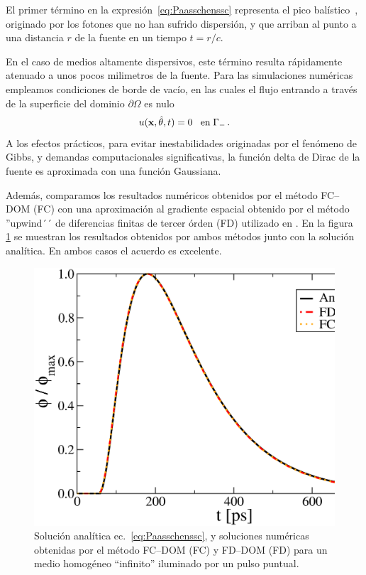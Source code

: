 El primer término en la expresión~\eqref{eq:Paasschenssc} 
representa el pico balístico~\cite{Paasschens1997}, originado 
por los fotones que no han sufrido dispersión, y que arriban al punto 
a una distancia $r$ de la fuente en un tiempo $t=r/c$.

En el caso de medios altamente dispersivos, este término resulta rápidamente atenuado 
a unos pocos milimetros de la fuente. Para las simulaciones numéricas 
empleamos condiciones de borde de vacío, en las cuales el flujo 
entrando a través de la superficie del dominio $\partial \Omega$ es nulo 
\begin{equation}
u(\mathbf{x},\hat{\theta},t)=0 \;\;\; \text{en}\; \Gamma_{-} \, .
\label{eq:vacuumbc}
\end{equation}
A los efectos prácticos, para evitar inestabilidades originadas 
por el fenómeno de Gibbs, y demandas computacionales significativas, 
la función delta de Dirac de la fuente es aproximada con una función Gaussiana.

Además, comparamos los resultados numéricos obtenidos por el método FC--DOM (FC)
con una aproximación al gradiente espacial obtenido por el método ''upwind´´ 
de diferencias finitas de tercer órden (FD) utilizado en \cite{Fujii2014}. 
En la figura~ \ref{fig:analytic1} se muestran los resultados obtenidos por ambos métodos 
junto con la solución analítica. En ambos casos el acuerdo es excelente.

 \begin{figure}[h]
\centering
  \includegraphics[width=0.48\linewidth]{figuras/analytic1.eps}
  \caption{Solución analítica ec.~\eqref{eq:Paasschenssc}, 
  y soluciones numéricas obtenidas por el método FC--DOM (FC) 
  y FD--DOM (FD) para un medio homogéneo ``infinito'' iluminado 
  por un pulso puntual.}
 \label{fig:analytic1}
\end{figure}
 
